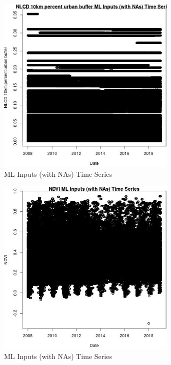 \begin{figure} 
\centering  
\includegraphics[width=0.77\textwidth]{Code_Outputs/Report_ML_input_PM25_Step4_part_f_de_duplicated_aveswNAs_NLCD_10km_percent_urban_buffervDate.jpg} 
\caption{\label{fig:Report_ML_input_PM25_Step4_part_f_de_duplicated_aveswNAsNLCD_10km_percent_urban_buffervDate}ML Inputs (with NAs) Time Series} 
\end{figure} 
 

\begin{figure} 
\centering  
\includegraphics[width=0.77\textwidth]{Code_Outputs/Report_ML_input_PM25_Step4_part_f_de_duplicated_aveswNAs_NDVIvDate.jpg} 
\caption{\label{fig:Report_ML_input_PM25_Step4_part_f_de_duplicated_aveswNAsNDVIvDate}ML Inputs (with NAs) Time Series} 
\end{figure} 
 

